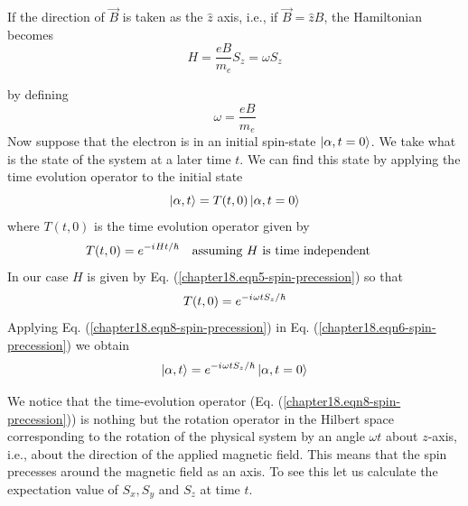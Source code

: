 If the direction of $\vec{B}$ is taken as the $\hat{z}$ axis, i.e., if $\vec{B} = \hat{z} B$, the Hamiltonian becomes
\begin{equation}
\label{chapter18.eqn5-spin-precession}
H =  \frac{e B}{m_e} S_z = \omega S_z
\end{equation}

by defining
\begin{equation}
\label{chapter18.eqn4-spin-precession}
\omega = \frac{e B}{m_e}
\end{equation}
Now suppose that the electron is in an initial spin-state $\ket{\alpha, t=0}$. We take what is the state of the system at a later time $t$. We can find this state by applying the time evolution operator to the initial state
\begin{equation}
\label{chapter18.eqn6-spin-precession}
\ket{\alpha, t} = T(t, 0)\ket{\alpha, t=0}
\end{equation}
where $T(t,0)$ is the time evolution operator given by
\begin{equation}
\label{chapter18.eqn7-spin-precession}
T(t, 0) = e^{-\iu H t/\hbar} \qq{assuming $H$ is time independent}
\end{equation}
In our case $H$ is given by Eq. (\ref{chapter18.eqn5-spin-precession}) so that
\begin{equation}
\label{chapter18.eqn8-spin-precession}
T(t, 0) = e^{-{i\mkern1mu} \omega t S_z / \hbar}
\end{equation}
Applying Eq. (\ref{chapter18.eqn8-spin-precession}) in Eq. (\ref{chapter18.eqn6-spin-precession}) we obtain
\begin{equation}
\label{chapter18.eqn9-spin-precession}
\ket{\alpha,t} = e^{-{i\mkern1mu} \omega t S_z / \hbar} \ket{\alpha,t=0}
\end{equation}

We notice that the time-evolution operator (Eq. (\ref{chapter18.eqn8-spin-precession})) is nothing but the rotation operator in the Hilbert space corresponding to the rotation of the physical system by an angle $\omega t$ about $z$-axis, i.e., about the direction of the applied magnetic field. This means that the spin precesses around the magnetic field as an axis. To see this let us calculate the expectation value of $S_x, S_y$ and $S_z$ at time $t$.

